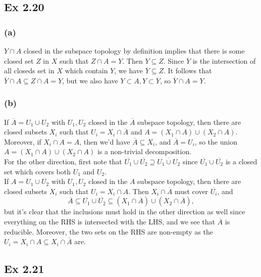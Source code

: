 \documentclass{article}
\theoremstyle{definition}
\begin{document}
\subsection*{Ex 2.20}

\subsubsection*{(a)}

$Y \cap A$ closed in the subspace topology by definition implies that there is
some closed set $Z$ in $X$ such that $Z \cap A = Y$. Then $Y \subseteq Z$.
Since $\overline{Y}$ is the intersection of all closeds set in $X$ which
contain $Y$, we have $\overline{Y} \subseteq Z$. It follows that $\overline{Y}
\cap A \subseteq Z \cap A = Y$, but we also have $Y \subset A, Y \subset
\overline{Y}$, so $\overline{Y} \cap A = Y$.

\subsubsection*{(b)}

If $\overline{A} = U_1 \cup U_2$ with $U_1, U_2$ closed in the $\overline{A}$
subspace topology, then there are closed subsets $X_i$ such that $U_i = X_i
\cap \overline{A}$ and $A = (X_1 \cap A) \cup (X_2 \cap A)$. Moreover, if $X_i
\cap A = A$, then we'd have $\overline{A} \subseteq X_i$, and $\overline{A} =
U_i$, so the union $A = (X_1 \cap A) \cup (X_2 \cap A)$ is a non-trivial
decomposition. \\

For the other direction, first note that $\overline{U_1} \cup \overline{U_2}
\supseteq \overline{U_1 \cup U_2}$ since $\overline{U_1} \cup \overline{U_2}$
is a closed set which covers both $U_1$ and $U_2$. \\

If $A = U_1 \cup U_2$ with $U_1, U_2$ closed in the $A$ subspace topology, then
there are closed subsets $X_i$ such that $U_i = X_i \cap A$. Then $X_i \cap
\overline{A}$ must cover $\overline{U_i}$, and 
\[
	\overline{A} 
	\subseteq 
	\overline{U_1} \cup \overline{U_2} 
	\subseteq 
	(X_1 \cap \overline{A}) \cup (X_2 \cap \overline{A}),
\] 
but it's clear that the inclusions must hold in the other direction as well
since everything on the RHS is intersected with the LHS, and we see that
$\overline{A}$ is reducible. Moreover, the two sets on the RHS are non-empty as
the $U_i = X_i \cap A \subseteq X_i \cap \overline{A}$ are.

\subsection*{Ex 2.21}
\end{document}
